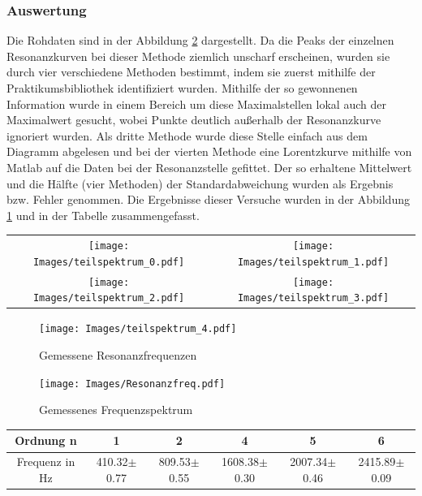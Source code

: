 \documentclass[]{article}
\begin{document}
	\subsubsection{Auswertung}
	Die Rohdaten sind in der Abbildung \ref{Resfreq} dargestellt. Da die Peaks der einzelnen Resonanzkurven bei dieser Methode ziemlich unscharf erscheinen, wurden sie durch vier verschiedene Methoden bestimmt, indem sie zuerst mithilfe der Praktikumsbibliothek identifiziert wurden. Mithilfe der so gewonnenen Information wurde in einem Bereich um diese Maximalstellen lokal auch der Maximalwert gesucht, wobei Punkte deutlich außerhalb der Resonanzkurve ignoriert wurden. Als dritte Methode wurde diese Stelle einfach aus dem Diagramm abgelesen und bei der vierten Methode eine Lorentzkurve mithilfe von Matlab auf die Daten bei der Resonanzstelle gefittet. Der so erhaltene Mittelwert und die Hälfte (vier Methoden) der Standardabweichung wurden als Ergebnis bzw. Fehler genommen. Die Ergebnisse dieser Versuche wurden in der Abbildung \ref{Resfreq_teil} und in der Tabelle zusammengefasst.\\
	\begin{center}
	\begin{tabular}{cc}
		\texttt{[image: Images/teilspektrum\_0.pdf]}& \texttt{[image: Images/teilspektrum\_1.pdf]}\\
		\texttt{[image: Images/teilspektrum\_2.pdf]}& \texttt{[image: Images/teilspektrum\_3.pdf]}\\		 
	\end{tabular} 
	\begin{figure}[h]
		\begin{center}
			\texttt{[image: Images/teilspektrum\_4.pdf]}
			\caption{Gemessene Resonanzfrequenzen}
			\label{Resfreq_teil}
		\end{center}
	\end{figure}
	\end{center}
 
	\begin{figure}
		\begin{center}
			\texttt{[image: Images/Resonanzfreq.pdf]}
			\caption{Gemessenes Frequenzspektrum}
			\label{Resfreq}
		\end{center}
	\end{figure}

	\begin{tabular}{|c|c|c|c|c|c|}
		\hline 
		Ordnung n&1  &2  &4  &5 &6  \\ 
		\hline 
		Frequenz in Hz& 410.32$\pm$0.77 &809.53$\pm$0.55  &1608.38$\pm$0.30  &2007.34$\pm$0.46  &2415.89$\pm$0.09  \\ 
		\hline 
	\end{tabular}
\end{document}
